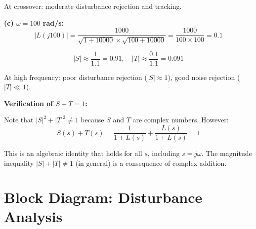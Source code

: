 \begin{example}[S + T = 1 and the Noise-Disturbance Tradeoff]
At crossover: moderate disturbance rejection and tracking.

\textbf{(c) $\omega = 100$ rad/s:}
\begin{equation}
|L(j100)| = \frac{1000}{\sqrt{1+10000} \times \sqrt{100+10000}} = \frac{1000}{100 \times 100} = 0.1
\end{equation}

\begin{equation}
|S| \approx \frac{1}{1.1} = 0.91, \quad |T| \approx \frac{0.1}{1.1} = 0.091
\end{equation}

At high frequency: poor disturbance rejection ($|S| \approx 1$), good noise rejection ($|T| \ll 1$).

\textbf{Verification of $S + T = 1$:}

Note that $|S|^2 + |T|^2 \neq 1$ because $S$ and $T$ are complex numbers. However:
\begin{equation}
S(s) + T(s) = \frac{1}{1+L(s)} + \frac{L(s)}{1+L(s)} = 1
\end{equation}

This is an algebraic identity that holds for all $s$, including $s = j\omega$. The magnitude inequality $|S| + |T| \neq 1$ (in general) is a consequence of complex addition.
\end{example}

\section{Block Diagram: Disturbance Analysis}
\label{sec:block_diagram}

